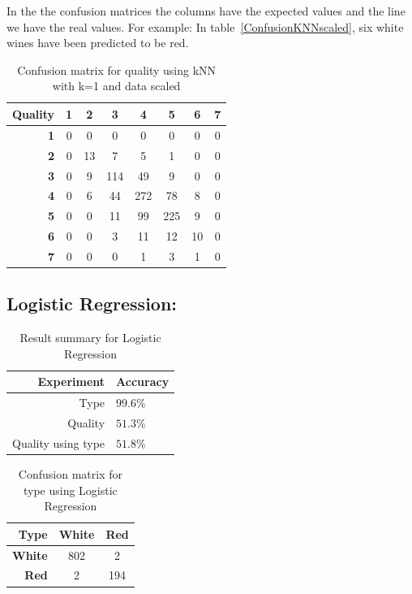 \documentclass[twoside]{article}
\begin{document}
\begin{multicols}{2}
In the the confusion matrices the columns have the expected values and the line we have the real values. For example: In table~\ref{ConfusionKNNscaled}, six white wines have been predicted to be red.

\begin{table}[H]
\caption{Confusion matrix for quality using kNN with k=1 and data scaled}
\centering
\begin{tabular}{r||c|c|c|c|c|c|c}
\textbf{Quality} & \textbf{1} & \textbf{2} & \textbf{3} & \textbf{4} & \textbf{5} & \textbf{6} & \textbf{7}\\
\hline \hline
\textbf{1} & 0 & 0 & 0 & 0 & 0 & 0 & 0\\
\hline
\textbf{2} & 0 & 13 & 7 & 5 & 1 & 0 & 0\\
\hline
\textbf{3} & 0 & 9 & 114 & 49 & 9 & 0 & 0\\
\hline
\textbf{4} & 0 & 6 & 44 & 272 & 78 & 8 & 0\\
\hline
\textbf{5} & 0 & 0 & 11 & 99 & 225 & 9 & 0\\
\hline
\textbf{6} & 0 & 0 & 3 & 11 & 12 & 10 & 0\\
\hline
\textbf{7} & 0 & 0 & 0 & 1 & 3 & 1 & 0\\
\end{tabular}
\end{table}


\subsection*{\textbf{Logistic Regression:}}
\begin{table}[H]
\caption{Result summary for Logistic Regression}
\centering
\begin{tabular}{r|l}
\textbf{Experiment} & \textbf{Accuracy}\\
\midrule
Type & $99.6\%$\\
Quality & $51.3\%$\\
Quality using type & $51.8\%$\\
\end{tabular}
\end{table}

\begin{table}[H]
\caption{Confusion matrix for type using Logistic Regression}
\centering
\begin{tabular}{r||c|c}
\textbf{Type} & \textbf{White} & \textbf{Red} \\
\hline \hline
\textbf{White} & 802  & 2\\
\hline
\textbf{Red} & 2 & 194\\
\end{tabular}
\end{table}


\end{multicols}
\end{document}
